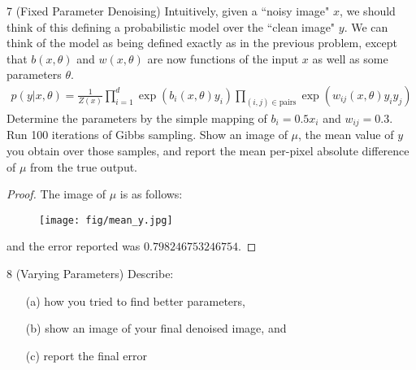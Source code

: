 \documentclass[12pt]{article}
\begin{document}
\newpage

\begin{problem}{7 (Fixed Parameter Denoising)} 
Intuitively, given a ``noisy image" $x$, we should think of this defining a probabilistic model over the ``clean image" $y$. We can think of the model as being defined exactly as in the previous problem, except that $b(x, \theta)$ and $w(x, \theta)$ are now functions of the input $x$ as well as some parameters $\theta$. 
\begin{align}
    p(y \vert x, \theta) = \frac{1}{Z(x)} \prod_{i=1}^d \exp( b_i(x,\theta ) y_i ) \prod_{(i,j)\in \text{pairs}} \exp(w_{ij}(x,\theta ) y_i y_j)
\end{align}
Determine the parameters by the simple mapping of $b_i=0.5 x_i$ and $w_{ij}=0.3$. Run 100 iterations of Gibbs sampling. Show an image of $\mu$, the mean value of $y$ you obtain over those samples, and report the mean per-pixel absolute difference of $\mu$ from the true output.
\end{problem}

\begin{proof} The image of $\mu$ is as follows:

\begin{figure}[!ht]
    \centering
    \texttt{[image: fig/mean\_y.jpg]}
\end{figure}

and the error reported was $0.798246753246754$.
\end{proof}

\newpage

\begin{problem}{8 (Varying Parameters)} Describe:
\vspace{-\topsep}
\begin{itemize}
    \item[(a)] how you tried to find better parameters,
    \item[(b)] show an image of your final denoised image, and 
    \item[(c)] report the final error
\end{itemize}

\end{problem}
\end{document}
